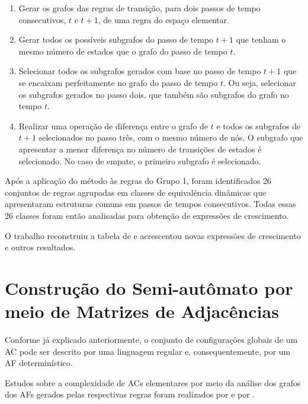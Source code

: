 \documentclass[12pt,a4paper]{article}
\begin{document}
\begin{enumerate}\label{sec:mikialgo}
\item Gerar os grafos das regras de transição, para dois passos de tempo
consecutivos, $t$ e $t+1$, de uma regra do espaço elementar.

\item Gerar todos os possíveis subgrafos do passo de tempo $t+1$ que tenham
o mesmo número de estados que o grafo do passo de tempo $t$.

\item Selecionar todos os subgrafos gerados com base no passo de tempo $t+1$
que se encaixam perfeitamente no grafo do passo de tempo $t$. Ou seja,
selecionar os subgrafos gerados no passo dois, que também são subgrafos do
grafo no tempo $t$.

\item Realizar uma operação de diferença entre o grafo de $t$ e todos os
subgrafos de $t+1$ selecionados no passo três, com o mesmo número de nós. O
subgrafo que apresentar a menor diferença no número de transições de estados
é selecionado. No caso de empate, o primeiro subgrafo é selecionado.
\end{enumerate}

Após a aplicação do método às regras do Grupo 1, foram identificados 26
conjuntos de regras agrupadas em classes de equivalência dinâmicas que
apresentaram estruturas comuns em passos de tempos consecutivos. Todas essas
26 classes foram então analisadas para obtenção de expressões
de crescimento.

O trabalho reconstruiu a tabela de  e acrescentou novas
expressões de crescimento e outros resultados.

\newpage

\section{Construção do Semi-autômato por meio de Matrizes de
Adjacências}\label{sec:desenv}

Conforme já explicado anteriormente, o conjunto de configurações globais de
um AC pode ser descrito por uma linguagem regular e,
consequentemente, por um AF determinístico.

Estudos sobre a complexidade de ACs elementares por meio da
análise dos grafos dos AFs gerados pelas respectivas regras
foram realizados por  e por .
\end{document}
